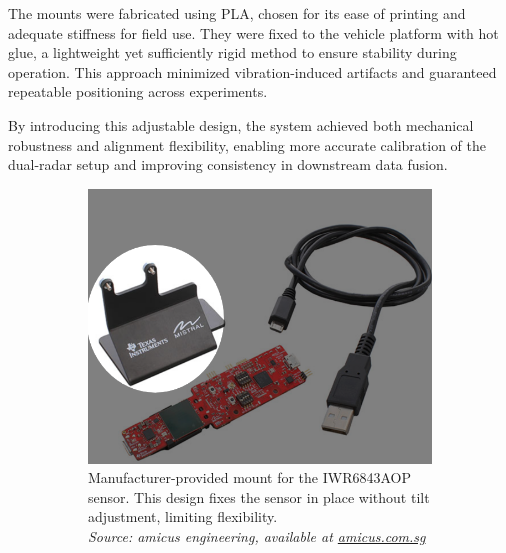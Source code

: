 The mounts were fabricated using PLA, chosen for its ease of printing and adequate stiffness for field use. 
They were fixed to the vehicle platform with hot glue, a lightweight yet sufficiently rigid method to ensure stability during operation. 
This approach minimized vibration-induced artifacts and guaranteed repeatable positioning across experiments.  

By introducing this adjustable design, the system achieved both mechanical robustness and alignment flexibility, enabling more accurate calibration of the dual-radar setup and improving consistency in downstream data fusion.  

\begin{figure}[!htbp]
    \centering
    \begin{subfigure}[t]{0.48\linewidth}
        \centering
        \includegraphics[width=\linewidth]{images/IWR6843Mount.png}
        \caption{Manufacturer-provided mount for the IWR6843AOP sensor. This design fixes the sensor in place without tilt adjustment, limiting flexibility.\\
        \textit{Source: amicus engineering, available at \href{https://amicus.com.sg/products/iwr6843aop-evaluation-module-for-single-chip-60ghz-antenna-on-package-aop-mmwave-sensor/}{amicus.com.sg}}}
        \label{fig:IWR6843AOP_mount}
    \end{subfigure}
    \hfill
    \begin{subfigure}[t]{0.48\linewidth}
        \centering

\end{subfigure}
\end{figure}
